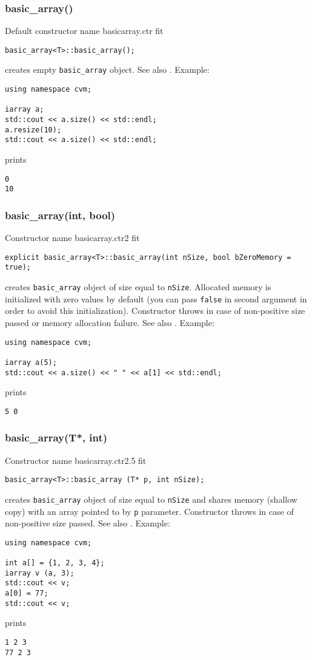 \subsubsection{basic\_array()}
Default constructor%
\pdfdest name {basicarray.ctr} fit
\begin{verbatim}
basic_array<T>::basic_array();
\end{verbatim}
creates  empty \verb"basic_array" object. See also 
.
Example:
\begin{Verbatim}
using namespace cvm;

iarray a;
std::cout << a.size() << std::endl;
a.resize(10);
std::cout << a.size() << std::endl;
\end{Verbatim}
prints
\begin{Verbatim}
0
10
\end{Verbatim}
\newpage


\subsubsection{basic\_array(int, bool)}
Constructor%
\pdfdest name {basicarray.ctr2} fit
\begin{verbatim}
explicit basic_array<T>::basic_array(int nSize, bool bZeroMemory = true);
\end{verbatim}
creates  \verb"basic_array" object of size equal to \verb"nSize". 
Allocated memory is initialized with zero values by default 
(you can pass \verb"false" in second argument in order to 
avoid this initialization). 
Constructor throws 
in case of non-positive size passed or memory allocation failure.
See also
.
Example:
\begin{Verbatim}
using namespace cvm;

iarray a(5);
std::cout << a.size() << " " << a[1] << std::endl;
\end{Verbatim}
prints
\begin{Verbatim}
5 0
\end{Verbatim}
\newpage


\subsubsection{basic\_array(T*, int)}
Constructor%
\pdfdest name {basicarray.ctr2.5} fit
\begin{verbatim}
basic_array<T>::basic_array (T* p, int nSize);
\end{verbatim}
creates  \verb"basic_array" object of size equal to 
\verb"nSize" and shares memory (shallow copy) with an array pointed to by \verb"p" parameter.
Constructor throws  
in case of non-positive size passed.
See also .
Example:
\begin{Verbatim}
using namespace cvm;

int a[] = {1, 2, 3, 4};
iarray v (a, 3);
std::cout << v;
a[0] = 77;
std::cout << v;
\end{Verbatim}
prints
\begin{Verbatim}
1 2 3
77 2 3
\end{Verbatim}
\newpage


